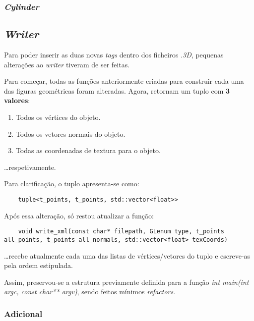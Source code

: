 \documentclass[relatorio.tex]{subfiles}
\begin{document}
\subsubsection{\textit{Cylinder}}


\subsection{\textit{Writer}} \label{subsec:writer}

Para poder inserir as duas novas \textit{tags}
dentro dos ficheiros \textit{.3D}, pequenas 
alterações ao \textit{writer} tiveram de ser feitas.

Para começar, todas as funções anteriormente 
criadas para construir cada uma das figuras 
geométricas foram alteradas.
Agora, retornam um tuplo com \textbf{3 valores}:
\begin{enumerate}
    \item Todos os vértices do objeto.
    \item Todos os vetores normais do objeto.
    \item Todas as coordenadas de textura para o objeto.
\end{enumerate}
\dots respetivamente.

Para clarificação, o tuplo apresenta-se como:
\begin{verbatim}
    tuple<t_points, t_points, std::vector<float>> 
\end{verbatim}

Após essa alteração, só restou atualizar a função:
\begin{verbatim}
    void write_xml(const char* filepath, GLenum type, t_points all_points, t_points all_normals, std::vector<float> texCoords)
\end{verbatim}
\dots recebe atualmente cada uma das listas de vértices/vetores 
do tuplo e escreve-as pela ordem estipulada.

Assim, preservou-se a estrutura previamente definida 
para a função \textit{int main(int argc, const char** argv)},
sendo feitos mínimos \textit{refactors}.

\subsubsection{Adicional} \label{subsec:aster}
\end{document}
